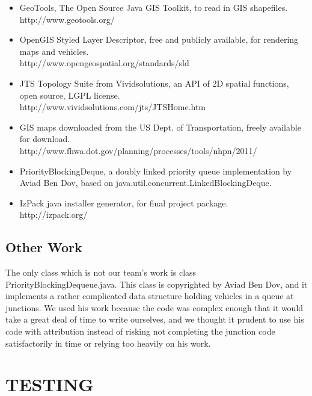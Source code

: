 \documentclass[11pt]{article}
\begin{document}
\begin{enumerate}
\begin{itemize}
\item GeoTools, The Open Source Java GIS Toolkit, to read in GIS shapefiles.
\\
http://www.geotools.org/

\item OpenGIS Styled Layer Descriptor, free and publicly available, for rendering maps and vehicles.
\\
http://www.opengeospatial.org/standards/sld

\item JTS Topology Suite from Vividsolutions, an API of 2D spatial functions, open source, LGPL license.
\\
http://www.vividsolutions.com/jts/JTSHome.htm

\item GIS maps downloaded from the US Dept. of Transportation, freely available for download.
\\
http://www.fhwa.dot.gov/planning/processes/tools/nhpn/2011/

\item PriorityBlockingDeque, a doubly linked priority queue implementation by Aviad Ben Dov, based on java.util.concurrent.LinkedBlockingDeque.

\item IzPack java installer generator, for final project package. 
\\
http://izpack.org/

\end{itemize}


\subsection{Other Work}

The only class which is not our team\textquoteright s work is class PriorityBlockingDequeue.java. This class is copyrighted by Aviad Ben Dov, and it implements a rather complicated data structure holding vehicles in a queue at junctions. We used his work because the code was complex enough that it would take a great deal of time to write ourselves, and we thought it prudent to use his code with attribution instead of risking not completing the junction code satisfactorily in time or relying too heavily on his work.



\section{TESTING}

\end{enumerate}
\end{document}
